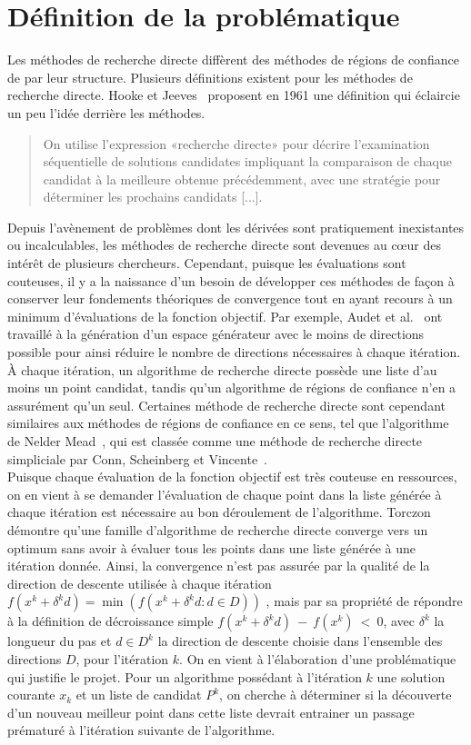 \section{Définition de la problématique}
Les méthodes de recherche directe diffèrent des méthodes de régions de confiance de par leur structure. Plusieurs définitions existent pour les méthodes de recherche directe. Hooke et Jeeves~\cite{HoJe61a} proposent en 1961 une définition qui éclaircie un peu l'idée derrière les méthodes.
\begin{quote}
	On utilise l'expression «recherche directe» pour décrire l'examination séquentielle de solutions candidates impliquant la comparaison de chaque candidat à la meilleure obtenue précédemment, avec une stratégie pour déterminer les prochains candidats [...].
\end{quote}
Depuis l'avènement de problèmes dont les dérivées sont pratiquement inexistantes ou incalculables, les méthodes de recherche directe sont devenues au cœur des intérêt de plusieurs chercheurs. Cependant, puisque les évaluations sont couteuses, il y a la naissance d'un besoin de développer ces méthodes de façon à conserver leur fondements théoriques de convergence tout en ayant recours à un minimum d'évaluations de la fonction objectif. Par exemple, Audet et al.~\cite{AuIaLeDTr2014} ont travaillé à la génération d'un espace générateur avec le moins de directions possible pour ainsi réduire le nombre de directions nécessaires à chaque itération.
À chaque itération, un algorithme de recherche directe possède une liste d'au moins un point candidat, tandis qu'un algorithme de régions de confiance n'en a assurément qu'un seul. Certaines méthode de recherche directe sont cependant similaires aux méthodes de régions de confiance en ce sens, tel que l'algorithme de Nelder Mead~\cite{NeMe65a}, qui est classée comme une méthode de recherche directe simpliciale par Conn, Scheinberg et Vincente~\cite{CoScVibook}.\\
Puisque chaque évaluation de la fonction objectif est très couteuse en ressources, on en vient à se demander l'évaluation de chaque point dans la liste générée à chaque itération est nécessaire au bon déroulement de l'algorithme. Torczon~\cite{Torc97a} démontre qu'une famille d'algorithme de recherche directe converge vers un optimum sans avoir à évaluer tous les points dans une liste générée à une itération donnée. Ainsi, la convergence n'est pas assurée par la qualité de la direction de descente utilisée à chaque itération $f(x^k+\delta^k d) = \min(f(x^k+\delta^k d:d\in D)) $ , mais par sa propriété de répondre à la définition de décroissance simple $f(x^k+\delta^k d)~-~f(x^k)~<~0$, avec $\delta^k$ la longueur du pas et $d \in D^k $ la direction de descente choisie dans l'ensemble des directions $D$, pour l'itération $k$. On en vient à l'élaboration d'une problématique qui justifie le projet. Pour un algorithme possédant à l'itération $k$ une solution courante $x_k$ et un liste de candidat $P^k$, on cherche à déterminer si la découverte d'un nouveau meilleur point dans cette liste devrait entrainer un passage prématuré à l'itération suivante de l'algorithme.\\
